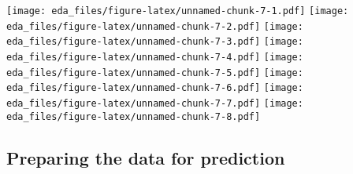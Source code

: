 \documentclass[
]{article}
\begin{document}
\texttt{[image: eda\_files/figure-latex/unnamed-chunk-7-1.pdf]}
\texttt{[image: eda\_files/figure-latex/unnamed-chunk-7-2.pdf]}
\texttt{[image: eda\_files/figure-latex/unnamed-chunk-7-3.pdf]}
\texttt{[image: eda\_files/figure-latex/unnamed-chunk-7-4.pdf]}
\texttt{[image: eda\_files/figure-latex/unnamed-chunk-7-5.pdf]}
\texttt{[image: eda\_files/figure-latex/unnamed-chunk-7-6.pdf]}
\texttt{[image: eda\_files/figure-latex/unnamed-chunk-7-7.pdf]}
\texttt{[image: eda\_files/figure-latex/unnamed-chunk-7-8.pdf]}

\hypertarget{preparing-the-data-for-prediction}{%
\subsection{Preparing the data for
prediction}\label{preparing-the-data-for-prediction}}
\end{document}
